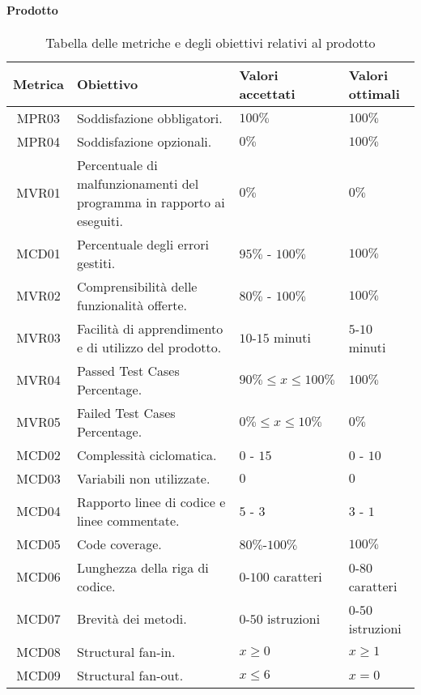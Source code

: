 \paragraph{Prodotto}
\begin{table}[H]
		\begin{center}
			\setlength{\aboverulesep}{0pt}
			\setlength{\belowrulesep}{0pt}
			\setlength{\extrarowheight}{.75ex}
			\begin{tabular}{ c C{6cm} C{3cm} C{3cm} }
				\textbf{Metrica} & \textbf{Obiettivo} & \textbf{Valori accettati} & \textbf{Valori ottimali}  \\
				\toprule
				MPR03 & Soddisfazione  obbligatori. & $100 \%$ & $100 \%$ \\
				MPR04 & Soddisfazione  opzionali. & $ 0 \%$ & $ 100\%$ \\
				MVR01 & Percentuale di malfunzionamenti del programma in rapporto ai  eseguiti. & $ 0\%$  & $0\%$ \\
				MCD01 & Percentuale degli errori gestiti. & $ 95\%$ - $100\% $ & $100\%$ \\
				MVR02 & Comprensibilità delle funzionalità offerte. & $ 80\%$ - $100\% $ & $100\%$ \\
				MVR03 & Facilità di apprendimento e di utilizzo del prodotto. & $10$-$15$ minuti & $5$-$10$ minuti \\
				MVR04 & Passed Test Cases Percentage. & $90\% \leq x \leq 100\% $& $100\%$ \\
				MVR05 & Failed Test Cases Percentage. & $0\% \leq x \leq 10\% $& $0\%$ \\				
				MCD02 & Complessità ciclomatica. & $0$ - $15$ & $0$ - $10$ \\
				MCD03 & Variabili non utilizzate. & $0$ & $0$ \\
				MCD04 & Rapporto linee di codice e linee commentate. & $5$ - $3$ & $3$ - $1$\\
				MCD05 & Code coverage. & $80\%$-$100\%$ & $100\%$ \\
				MCD06 & Lunghezza della riga di codice. & $0$-$100$ caratteri & $0$-$80$ caratteri \\
				MCD07 & Brevità dei metodi. & $0$-$50$ istruzioni & $0$-$50$ istruzioni \\
				MCD08 & Structural fan-in. & $ x \geq 0 $ & $ x \geq 1 $ \\
				MCD09 & Structural fan-out. & $ x \leq 6 $ & $ x = 0 $ \\
				\bottomrule
			\end{tabular}
			\caption{Tabella delle metriche e degli obiettivi relativi al prodotto}
		\end{center}
	\end{table}

